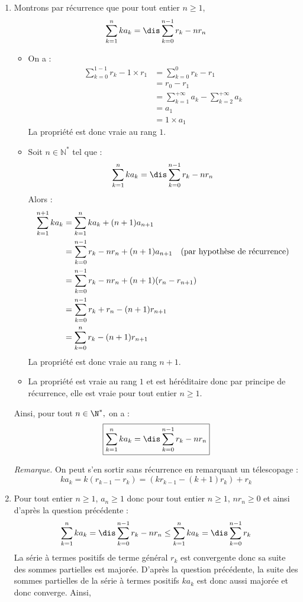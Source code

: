 \documentclass[a4paper,twoside,french,10pt]{VcCours}
\begin{document}
\begin{enumerate}
    \begin{enumerate}
        \item Montrons par récurrence que pour tout entier $n \geq 1$,
        $$ \sum_{k=1}^n ka_k=\dis\sum_{k=0}^{n-1} r_k-nr_n$$
    \begin{itemize}
    \item On a :
    \begin{align*}
    \sum_{k=0}^{1-1} r_k-1 \times r_1 & =  \sum_{k=0}^{0} r_k-r_1 \\
    & = r_0 - r_1 \\
    & = \sum_{k=1}^{+ \infty} a_k -\sum_{k=2}^{+ \infty} a_k \\
    & = a_1 \\
    & = 1 \times a_1
    \end{align*}
    La propriété est donc vraie au rang $1$.
    \item Soit $n \in \mathbb{N}^*$ tel que :
    $$ \sum_{k=1}^n ka_k=\dis\sum_{k=0}^{n-1} r_k-nr_n$$
    Alors :
    \begin{align*}
     \sum_{k=1}^{n+1} ka_k & =  \sum_{k=1}^n ka_k + (n+1)a_{n+1} \\
     & = \sum_{k=0}^{n-1} r_k-nr_n + (n+1)a_{n+1} \quad \hbox{(par hypothèse de récurrence)} \\
     & = \sum_{k=0}^{n-1} r_k-nr_n + (n+1)(r_n-r_{n+1}) \\
     & = \sum_{k=0}^{n-1} r_k + r_n -(n+1)r_{n+1} \\
     & = \sum_{k=0}^{n} r_k  -(n+1)r_{n+1} 
    \end{align*}
    La propriété est donc vraie au rang $n+1$.
    \item La propriété est vraie au rang $1$ et est héréditaire donc par principe de récurrence, elle est vraie pour tout entier $n \geq 1$.
    \end{itemize}
    Ainsi, pour tout $n\in\N^*,$ on a :
        $$\boxed{\sum_{k=1}^n ka_k=\dis\sum_{k=0}^{n-1} r_k-nr_n}$$
    
    \medskip
    
    \noindent \textit{Remarque.} On peut s'en sortir sans récurrence en remarquant un télescopage  :
    $$ k a_k = k (r_{k-1}-r_k) = (k r_{k-1} - (k+1) r_k) + r_k $$
        \item Pour tout entier $n \geq 1$, $a_n \geq 1$ donc pour tout entier $n \geq 1$, $n r_n \geq 0$ et ainsi d'après la question précédente :
        $$ \sum_{k=1}^n ka_k=\dis\sum_{k=0}^{n-1} r_k-nr_n \leq \sum_{k=1}^n ka_k=\dis\sum_{k=0}^{n-1} r_k$$
    La série à termes positifs de terme général $r_k$ est convergente donc sa suite des sommes partielles est majorée. D'après la question précédente, la suite des sommes partielles de la série à termes positifs $ka_k$ est donc aussi majorée et donc converge. Ainsi,
        

\end{enumerate}
\end{enumerate}
\end{document}
